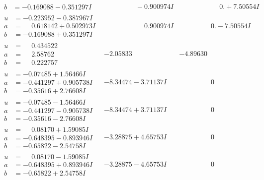 \documentclass[1p]{elsarticle_modified}
\theoremstyle{definition}
\begin{document}
$$\begin{array}{c|c|c}
\begin{aligned}
b &= -0.169088 - 0.351297 I\end{aligned}
 & \phantom{-0.000000 } -0.900974 I & \phantom{-0.000000 -}0. + 7.50554 I \\ \hline\begin{aligned}
u &= -0.223952 - 0.387967 I \\
a &= \phantom{-}0.618142 + 0.502973 I \\
b &= -0.169088 + 0.351297 I\end{aligned}
 & \phantom{-0.000000 -}0.900974 I & \phantom{-0.000000 } 0. - 7.50554 I \\ \hline\begin{aligned}
u &= \phantom{-}0.434522\phantom{ +0.000000I} \\
a &= \phantom{-}2.58762\phantom{ +0.000000I} \\
b &= \phantom{-}0.222757\phantom{ +0.000000I}\end{aligned}
 & -2.05833\phantom{ +0.000000I} & -4.89630\phantom{ +0.000000I} \\ \hline\begin{aligned}
u &= -0.07485 + 1.56466 I \\
a &= -0.441297 + 0.905738 I \\
b &= -0.35616 + 2.76608 I\end{aligned}
 & -8.34474 - 3.71137 I & \phantom{-0.000000 } 0 \\ \hline\begin{aligned}
u &= -0.07485 - 1.56466 I \\
a &= -0.441297 - 0.905738 I \\
b &= -0.35616 - 2.76608 I\end{aligned}
 & -8.34474 + 3.71137 I & \phantom{-0.000000 } 0 \\ \hline\begin{aligned}
u &= \phantom{-}0.08170 + 1.59085 I \\
a &= -0.648395 - 0.893946 I \\
b &= -0.65822 - 2.54758 I\end{aligned}
 & -3.28875 + 4.65753 I & \phantom{-0.000000 } 0 \\ \hline\begin{aligned}
u &= \phantom{-}0.08170 - 1.59085 I \\
a &= -0.648395 + 0.893946 I \\
b &= -0.65822 + 2.54758 I\end{aligned}
 & -3.28875 - 4.65753 I & \phantom{-0.000000 } 0 \\ \hline\begin{aligned}

\end{aligned}
\end{array}$$
\end{document}
